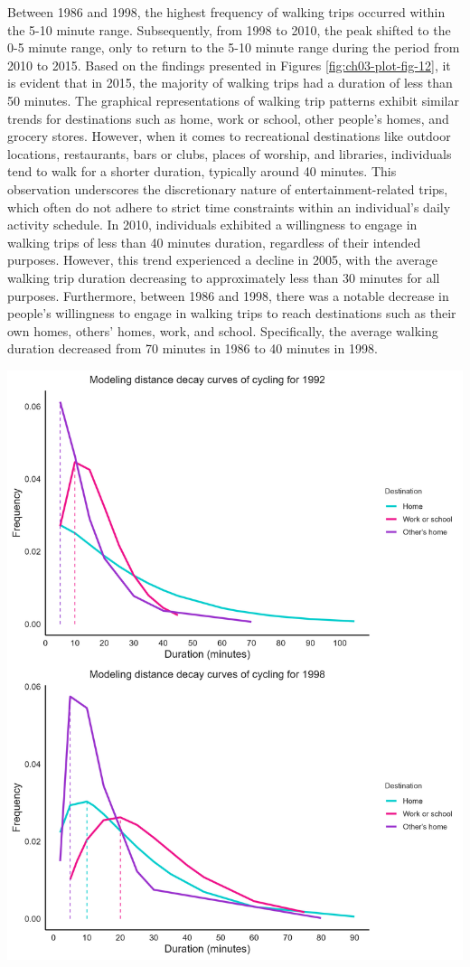 \documentclass[
11pt, %
oneside, %
english, %
singlespacing, %
]{macthesis} %
\begin{document}
Between 1986 and 1998, the highest frequency of walking trips occurred within the 5-10 minute range. Subsequently, from 1998 to 2010, the peak shifted to the 0-5 minute range, only to return to the 5-10 minute range during the period from 2010 to 2015. Based on the findings presented in Figures \ref{fig:ch03-plot-fig-12}, it is evident that in 2015, the majority of walking trips had a duration of less than 50 minutes. The graphical representations of walking trip patterns exhibit similar trends for destinations such as home, work or school, other people's homes, and grocery stores. However, when it comes to recreational destinations like outdoor locations, restaurants, bars or clubs, places of worship, and libraries, individuals tend to walk for a shorter duration, typically around
40 minutes. This observation underscores the discretionary nature of entertainment-related trips, which often do not adhere to strict time constraints within an individual's daily activity schedule. In 2010, individuals exhibited a willingness to engage in walking trips of less than 40 minutes duration, regardless of their intended purposes. However, this trend experienced a decline in 2005, with the average walking trip duration decreasing to approximately less than 30 minutes for all purposes. Furthermore, between 1986 and 1998, there was a notable decrease in people's willingness to engage
in walking trips to reach destinations such as their own homes, others' homes, work, and school. Specifically, the average walking duration decreased from 70 minutes in 1986 to 40 minutes in 1998.

\begin{center}\includegraphics[width=1\linewidth]{figure/ch03_fig_13} \end{center}
\end{document}
